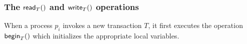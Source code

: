 


























\subsubsection{The ${\sf read}_T()$ and  ${\sf write}_T()$  operations}
When a process $p_i$ invokes a new transaction $T$,  it first 
executes the operation ${\sf begin}_T()$ which  initializes the
appropriate  local variables. 



